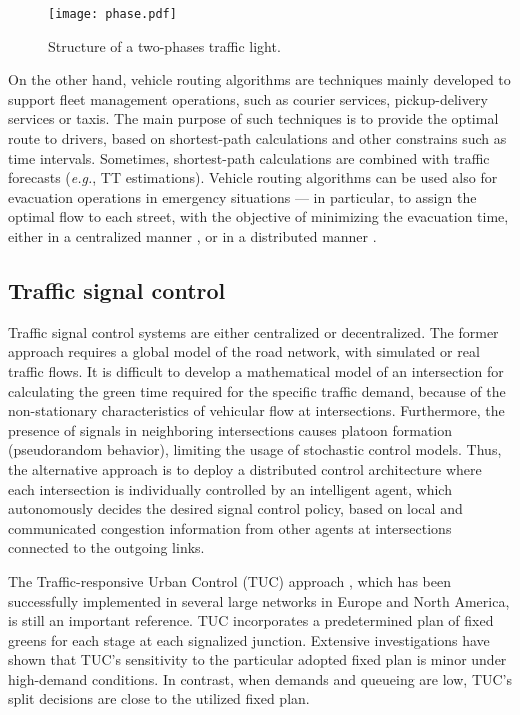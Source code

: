 \documentclass[10pt,onecolumn]{article}
\begin{document}
\begin{figure}[h]
\centering
\texttt{[image: phase.pdf]}
\caption{Structure of a two-phases traffic light.}
\label{light.phase}
\end{figure} 

On the other hand, vehicle routing algorithms are techniques mainly developed to support fleet management operations, such as courier services, pickup-delivery services or taxis. The main purpose of such techniques is to provide the optimal route to drivers, based on shortest-path calculations and other constrains such as time intervals. 
Sometimes, shortest-path calculations are combined with traffic forecasts (\textit{e.g.}, TT estimations). Vehicle routing algorithms can be used also for evacuation operations in emergency situations --- in particular, to assign the optimal flow to each street, with the objective of minimizing the evacuation time, either in a centralized manner \cite{HamzaLup2005}, or in a distributed manner \cite{Goldstein2008}.


\subsection{Traffic signal control}

Traffic signal control systems are either centralized or decentralized. The former approach requires a global model of the road network, with simulated or real traffic flows. It is difficult to develop a mathematical model of an intersection for calculating the green time required for the specific traffic demand, because of the non-stationary characteristics of vehicular flow at intersections. Furthermore, the presence of signals in neighboring intersections causes platoon formation (pseudorandom behavior), limiting the usage of stochastic control models. 
Thus, the alternative approach is to deploy a distributed control architecture where each intersection is individually controlled by an intelligent agent, which autonomously decides the desired signal control policy, based on local and communicated congestion information from other agents at intersections connected to the outgoing links.

The Traffic-responsive Urban Control (TUC) approach \cite{Diakaki2002}, which has been successfully implemented in several large networks in Europe and North America, is still an important reference. TUC incorporates a predetermined plan of fixed greens for each stage at each signalized junction. Extensive investigations have shown that TUC's sensitivity to the particular adopted fixed plan is minor under high-demand conditions. In contrast, when demands and queueing are low, TUC's split decisions are close to the utilized fixed plan. 
\end{document}
